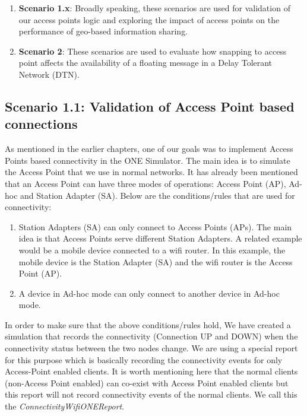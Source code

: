 \begin{enumerate}
	\item \textbf{Scenario 1.x}: Broadly speaking, these scenarios are used for validation of our access points logic and exploring the impact of access points on the performance of geo-based information sharing.
	\item \textbf{Scenario 2}: These scenarios are used to evaluate how snapping to access point affects the availability of a floating message in a Delay Tolerant Network (DTN).
\end{enumerate}
\subsection{Scenario 1.1: Validation of Access Point based connections}
As mentioned in the earlier chapters, one of our goals was to implement Access Points based connectivity in the ONE Simulator. The main idea is to simulate the Access Point that we use in normal networks. It has already been mentioned that an Access Point can have three modes of operations: Access Point (AP), Ad-hoc and Station Adapter (SA). Below are the conditions/rules that are used for connectivity:
\begin{enumerate}
	\item Station Adapters (SA) can only connect to Access Points (APs). The main idea is that Access Points serve different Station Adapters. A related example would be a mobile device connected to a wifi router. In this example, the mobile device is the Station Adapter (SA) and the wifi router is the Access Point (AP).
   	\item A device in Ad-hoc mode can only connect to another device in Ad-hoc mode.
\end{enumerate}
In order to make sure that the above conditions/rules hold, We have created a simulation that records the connectivity (Connection UP and DOWN) when the connectivity status between the two nodes change. We are using a special report for this purpose which is basically recording the connectivity events for only Access-Point enabled clients. It is worth mentioning here that the normal clients (non-Access Point enabled) can co-exist with Access Point enabled clients but this report will not record connectivity events of the normal clients. We call this the \textit{ConnectivityWifiONEReport}.
\vspace{3mm}
